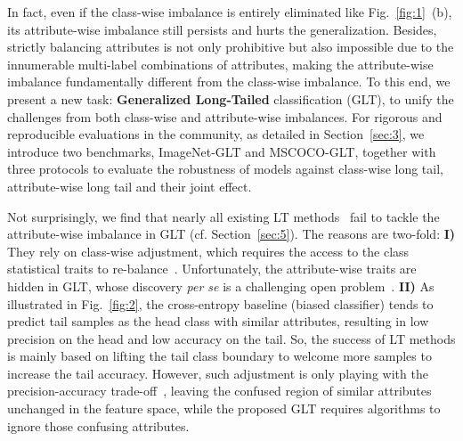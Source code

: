 \documentclass{article}
\begin{document}
In fact, even if the class-wise imbalance is entirely eliminated like Fig.~\ref{fig:1}~(b), its attribute-wise imbalance still persists and hurts the generalization. Besides, strictly balancing attributes is not only prohibitive but also impossible due to the innumerable multi-label combinations of attributes, making the attribute-wise imbalance fundamentally different from the class-wise imbalance. To this end, we present a new task: \textbf{Generalized Long-Tailed} classification (GLT), to unify the challenges from both class-wise and attribute-wise imbalances. For rigorous and reproducible evaluations in the community, as detailed in Section~\ref{sec:3}, we introduce two benchmarks, ImageNet-GLT and MSCOCO-GLT, together with three protocols to evaluate the robustness of models against class-wise long tail, attribute-wise long tail and their joint effect.







Not surprisingly, we find that nearly all existing LT methods~\cite{zhu2022cross,menon2020long,kang2019decoupling,ren2020balanced} fail to tackle the attribute-wise imbalance in GLT (cf. Section~\ref{sec:5}). The reasons are two-fold: 
\textbf{I)} They rely on class-wise adjustment, which requires the access to the class statistical traits to re-balance~\cite{tan2020equalization,cao2019ldam,kang2019decoupling,zhou2019bbn}. Unfortunately, the attribute-wise traits are hidden in GLT, whose discovery \emph{per se} is a challenging open problem~\cite{li2021discover}. 
\textbf{II)} As illustrated in Fig.~\ref{fig:2}, the cross-entropy baseline (biased classifier) tends to predict tail samples as the head class with similar attributes, resulting in low precision on the head and low accuracy on the tail. So, the success of LT methods is mainly based on lifting the tail class boundary to welcome more samples to increase the tail accuracy. However, such adjustment is only playing with the precision-accuracy trade-off~\cite{zhu2021cross}, leaving the confused region of similar attributes unchanged in the feature space, while the proposed GLT requires algorithms to ignore those confusing attributes.
\end{document}
